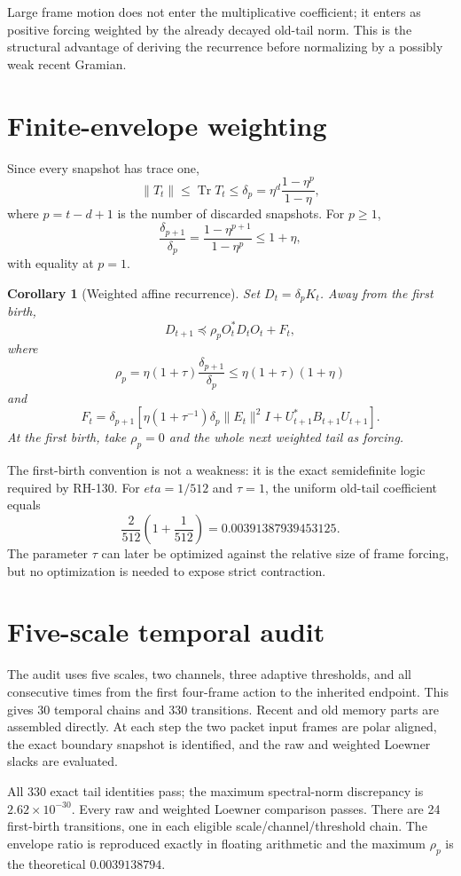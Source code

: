 \documentclass[12pt]{article}
\newtheorem{corollary}[theorem]{Corollary}
\newcommand{\Tr}{\operatorname{Tr}}
\begin{document}
Large frame motion does not enter the multiplicative coefficient; it enters
as positive forcing weighted by the already decayed old-tail norm.  This is
the structural advantage of deriving the recurrence before normalizing by a
possibly weak recent Gramian.

\section{Finite-envelope weighting}
Since every snapshot has trace one,
\[
 \|T_t\|\leq\Tr T_t\leq
 \delta_p=\eta^d\frac{1-\eta^p}{1-\eta},
\]
where $p=t-d+1$ is the number of discarded snapshots.  For $p\geq1$,
\[
 \frac{\delta_{p+1}}{\delta_p}
 =\frac{1-\eta^{p+1}}{1-\eta^p}
 \leq1+\eta,
\]
with equality at $p=1$.

\begin{corollary}[Weighted affine recurrence]\label{cor:weighted}
Set $D_t=\delta_pK_t$.  Away from the first birth,
\[
 D_{t+1}\preceq\rho_p O_t^*D_tO_t+F_t,
\]
where
\[
 \rho_p=\eta(1+\tau)\frac{\delta_{p+1}}{\delta_p}
 \leq\eta(1+\tau)(1+\eta)
\]
and
\[
 F_t=\delta_{p+1}\left[
 \eta(1+\tau^{-1})\delta_p\|E_t\|^2I
 +U_{t+1}^*B_{t+1}U_{t+1}
 \right].
\]
At the first birth, take $\rho_p=0$ and the whole next weighted tail as
forcing.
\end{corollary}

The first-birth convention is not a weakness: it is the exact semidefinite
logic required by RH-130.  For $eta=1/512$ and $\tau=1$, the uniform old-tail
coefficient equals
\[
 \frac{2}{512}\left(1+\frac1{512}\right)
 =0.00391387939453125.
\]
The parameter $\tau$ can later be optimized against the relative size of
frame forcing, but no optimization is needed to expose strict contraction.

\section{Five-scale temporal audit}
The audit uses five scales, two channels, three adaptive thresholds, and all
consecutive times from the first four-frame action to the inherited endpoint.
This gives 30 temporal chains and 330 transitions.  Recent and old memory
parts are assembled directly.  At each step the two packet input frames are
polar aligned, the exact boundary snapshot is identified, and the raw and
weighted Loewner slacks are evaluated.

All 330 exact tail identities pass; the maximum spectral-norm discrepancy is
$2.62\times10^{-30}$.  Every raw and weighted Loewner comparison passes.
There are 24 first-birth transitions, one in each eligible
scale/channel/threshold chain.  The envelope ratio is reproduced exactly in
floating arithmetic and the maximum $\rho_p$ is the theoretical
$0.0039138794$.
\end{document}
